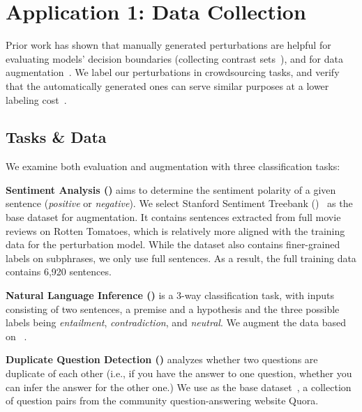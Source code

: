 \section{Application 1: Data Collection}
\label{sec:app_label}




Prior work has shown that manually generated perturbations are helpful for evaluating models' decision boundaries (\eg collecting contrast sets~\cite{gardner2020contrast}), and for data augmentation~\cite{kaushik2019learning, kaushik2020explaining, teney2020learning}.
We label our perturbations in crowdsourcing tasks, and verify that the automatically generated ones can serve similar purposes at a lower labeling cost~\cite{Khashabi2020MoreBF}.

\subsection{Tasks \& Data}

We examine both evaluation and augmentation with three classification tasks: 

\textbf{Sentiment Analysis (\sst)} aims to determine the sentiment polarity of a given sentence (\emph{positive} or \emph{negative}). 
We select Stanford Sentiment Treebank (\dsst)~\cite{socher2013recursive} as the base dataset for augmentation.
It contains sentences extracted from full movie reviews on Rotten Tomatoes, which is relatively more aligned with the training data for the perturbation model. 
While the dataset also contains finer-grained labels on subphrases, we only use full sentences.
As a result, the full training data contains 6,920 sentences.

\textbf{Natural Language Inference (\nli)} is a 3-way classification task, with inputs consisting of two sentences, a premise and a hypothesis and the three possible labels being \emph{entailment}, \emph{contradiction}, and \emph{neutral}.
 We augment the data based on \dnli~\cite{bowman-etal-2015-large}. 
 
\textbf{Duplicate Question Detection (\qqp)} analyzes whether two questions are duplicate of each other (i.e., if you have the answer to one question, whether you can infer the answer for the other one.) 
We use \dqqp as the base dataset~\cite{wang2018glue}, a collection of question pairs from the community question-answering website Quora.



